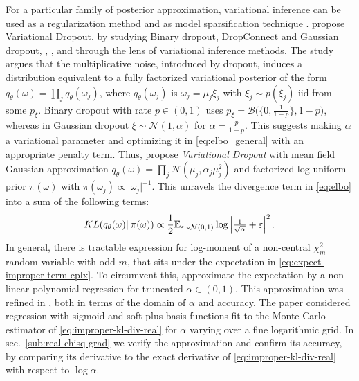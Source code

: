 \documentclass[a4paper,10pt]{article}
\begin{document}
For a particular family of posterior approximation, variational inference can be used
as a regularization method \cite{kingma_variational_2015} and as model sparsification
technique \cite{molchanov_variational_2017}. \cite{kingma_variational_2015} propose
Variational Dropout, by studying Binary dropout, DropConnect and Gaussian dropout,
\cite{hinton_improving_2012,wan_regularization_2013}, \cite{srivastava_dropout_2014},
and \cite{wang_fast_2013} through the lens of variational inference methods. The study
argues that the multiplicative noise, introduced by dropout, induces a distribution
equivalent to a fully factorized variational posterior of the form $
  q_\theta(\omega) = \prod_j q_{\theta}(\omega_j)
$, where $q_{\theta}(\omega_j)$ is $\omega_j = \mu_j \xi_j$ with $\xi_j \sim p(\xi_j)$
iid from some $p_\xi$. Binary dropout with rate $p \in (0, 1)$ uses $
  p_\xi
    = \mathcal{B}\bigl(
      \{0, \tfrac1{1-p}\}, 1-p
    \bigr)
$, whereas in Gaussian dropout $
  \xi \sim \mathcal{N}(1, \alpha)
$ for $\alpha = \tfrac{p}{1-p}$. This suggests making $\alpha$ a variational parameter
and optimizing it in \eqref{eq:elbo_general} with an appropriate penalty term. Thus,
\cite{kingma_variational_2015} propose \textit{Variational Dropout} with mean field
Gaussian approximation $
  q_\theta(\omega)
    = \prod_j \mathcal{N}(\mu_j, \alpha_j \mu_j^2)
$ and factorized log-uniform prior $\pi(\omega)$ with $
  \pi(\omega_j) \propto \lvert \omega_j \rvert^{-1}
$. This unravels the divergence term in \eqref{eq:elbo} into a sum of the following terms:
\begin{equation} \label{eq:improper-kl-div-real}
  KL(q_\theta(\omega) \| \pi(\omega))
    \propto
      \frac12 \mathbb{E}_{\varepsilon \sim \mathcal{N}(0, 1)}
        \log{\Bigl\lvert \tfrac1{\sqrt{\alpha}} + \varepsilon \Bigr\rvert^2}
  \,.
\end{equation}
In general, there is tractable expression for log-moment of a non-central $\chi^2_m$ random
variable with odd $m$, that sits under the expectation in \eqref{eq:expect-improper-term-cplx}.
To circumvent this, \cite{kingma_variational_2015} approximate the expectation by a non-linear
polynomial regression for truncated $\alpha \in (0, 1)$. This approximation was refined in
\cite{molchanov_variational_2017}, both in terms of the domain of $\alpha$ and accuracy. The
paper considered regression with sigmoid and soft-plus basis functions fit to the Monte-Carlo
estimator of \eqref{eq:improper-kl-div-real} for $\alpha$ varying over a fine logarithmic grid.
In sec.~\ref{sub:real-chisq-grad} we verify the approximation and confirm its accuracy, by
comparing its derivative to the exact derivative of \eqref{eq:improper-kl-div-real} with
respect to $\log \alpha$.
\end{document}
